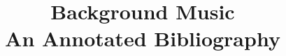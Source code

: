 \documentclass [12pt,letterpaper]{report}
\title{Background Music\\\medskip An Annotated Bibliography}
\author{}
\begin{document}
\nocite{*}


\end{document}
